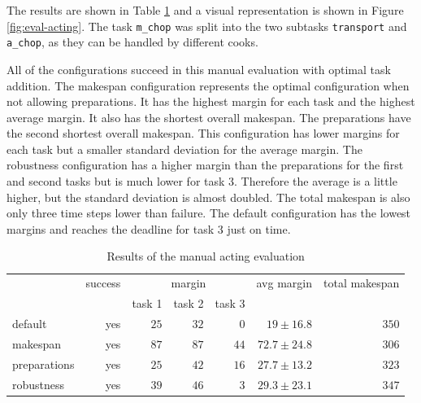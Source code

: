 The results are shown in Table \ref{tab:eval-acting} and a visual representation is shown in Figure \ref{fig:eval-acting}.
The task \verb|m_chop| was split into the two subtasks \verb|transport| and \verb|a_chop|, as they can be handled by different cooks. 

All of the configurations succeed in this manual evaluation with optimal task addition.
The makespan configuration represents the optimal configuration when not allowing preparations.
It has the highest margin for each task and the highest average margin.
It also has the shortest overall makespan.
The preparations have the second shortest overall makespan.
This configuration has lower margins for each task but a smaller standard deviation for the average margin.
The robustness configuration has a higher margin than the preparations for the first and second tasks but is much lower for task 3.
Therefore the average is a little higher, but the standard deviation is almost doubled.
The total makespan is also only three time steps lower than failure.
The default configuration has the lowest margins and reaches the deadline for task 3 just on time.

\begin{table}
  \centering
  \begin{tabular}{lrrrrrr}
                & success & \multicolumn{3}{c}{margin}  & avg margin     & total makespan  \\
                &         &  task 1 & task 2  & task 3  &                &  \\ \hline
  default       & yes     & $25$    & $32$    &  $0$    & $19\pm16.8$           & $350$     \\
  makespan      & yes     & $87$    & $87$    &  $44$   & $72.7\pm24.8$         & $306$       \\
  preparations  & yes     & $25$    & $42$    &  $16$   & $27.7\pm13.2$         & $323$    \\
  robustness    & yes     & $39$    & $46$    &  $3$    & $29.3\pm23.1$         & $347$ \\
  \end{tabular}
  \caption{Results of the manual acting evaluation}
  \label{tab:eval-acting}
\end{table}



